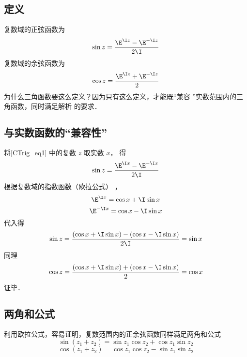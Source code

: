 
\subsection{定义}
复数域的正弦函数为
\begin{equation}\label{CTrig_eq1}
\sin z = \frac{\E^{\I z} - \E^{ - \I z}}{2\I}
\end{equation}
复数域的余弦函数为
\begin{equation}\label{CTrig_eq2}
\cos z = \frac{{{\E^{\I z}} + {\E^{ - \I z}}}}{2}
\end{equation}
为什么三角函数要这么定义？因为只有这么定义，才能既“兼容%
”实数范围内的三角函数，同时满足解析%
的要求．

\subsection{与实数函数的“兼容性”}
将\autoref{CTrig_eq1} 中的复数 $z$ 取实数 $x$， 得
\begin{equation}
\sin z = \frac{{{\E^{\I x}} - {\E^{ - \I x}}}}{{2\I}}
\end{equation} 
根据复数域的指数函数（欧拉公式）
，%
 \begin{equation}
{\E^{\I x}} = \cos x + \I\sin x
\end{equation} 
\begin{equation}
{\E^{ - \I x}} = \cos x - \I \sin x
\end{equation} 
代入得
\begin{equation}
\sin z = \frac{{\left( {\cos x + \I\sin x} \right) - \left( {\cos x - \I\sin x} \right)}}{{2\I}} = \sin x
\end{equation}  
同理
\begin{equation}
\cos z = \frac{{\left( {\cos x + \I\sin x} \right) + \left( {\cos x - \I\sin x} \right)}}{2} = \cos x
\end{equation}   
证毕．

\subsection{两角和公式}
利用欧拉公式，容易证明，复数范围内的正余弦函数同样满足两角和公式
\begin{equation}\label{CTrig_eq3}
\sin \left( {{z_1} + {z_2}} \right) = \sin {z_1}\cos {z_2} + \cos {z_1}\sin {z_2}
\end{equation}
\begin{equation}\label{CTrig_eq4}
\cos \left( {{z_1} + {z_2}} \right) = \cos {z_1}\cos {z_2} - \sin {z_1}\sin {z_2}
\end{equation}
